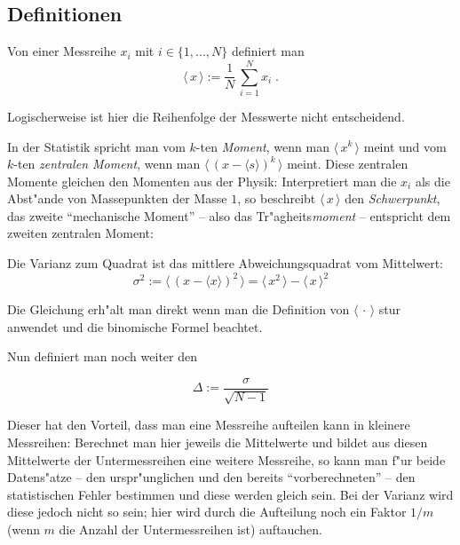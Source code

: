 \documentclass[a4paper]{book}
\newcommand{\mittel}[1]{\ensuremath{\langle  \, #1 \,  \rangle}}
\begin{document}
\subsection{Definitionen}
\label{sec:definitionen}


\begin{Def}
  [Mittelwert $\mittel \cdot$]
Von einer Messreihe $x_i$ mit $i  \in \{ 1, ..., N \}$ definiert man
\begin{equation}
  \label{eq:84}
  \mittel x := \frac{1}{N} \, \sum_{i = 1}^N x_i \;.
\end{equation}
\end{Def}
Logischerweise ist hier die Reihenfolge der Messwerte nicht
entscheidend.

In der Statistik spricht man vom $k$-ten \emph{Moment}, wenn man
$\mittel{ x^k }$ meint und vom $k$-ten \emph{zentralen Moment},
wenn man $\mittel{ (x-\langle s  \rangle)^k}$ meint. Diese
zentralen Momente gleichen den Momenten aus der Physik: Interpretiert
man die $x_i$ als die Abst"ande von Massepunkten der Masse $1$, so
beschreibt $\mittel x$ den \emph{Schwerpunkt}, das zweite
"`mechanische Moment"' -- also das Tr"agheits\emph{moment} --
entspricht dem zweiten zentralen Moment:

\begin{Def}
   Die Varianz zum Quadrat ist das mittlere
  Abweichungsquadrat vom Mittelwert:
  \begin{equation}
    \label{eq:85}
    \sigma^2 := \mittel{ (x-\langle x  \rangle )^2 }
= \mittel{ x^2  } - \mittel{ x  }^2
  \end{equation}
\end{Def}
Die Gleichung erh"alt man direkt wenn man die Definition von $\mittel
\cdot$ stur anwendet und die binomische Formel beachtet.

Nun definiert man noch weiter den 
\begin{Def}
  \begin{equation}
    \label{eq:86}
    \Delta := \frac{\sigma}{\sqrt{ N - 1}}
  \end{equation}
\end{Def}
Dieser hat den Vorteil, dass man eine Messreihe aufteilen kann in
kleinere Messreihen: Berechnet man hier jeweils die Mittelwerte 
und bildet aus diesen Mittelwerte der Untermessreihen eine weitere
Messreihe, so kann man f"ur beide Datens"atze -- den urspr"unglichen
und den bereits "`vorberechneten"' -- den statistischen Fehler
bestimmen und diese werden gleich sein. Bei der Varianz wird diese
jedoch nicht so sein; hier wird durch die Aufteilung noch ein Faktor
$1/m$ (wenn $m$ die Anzahl der Untermessreihen ist) auftauchen.
\end{document}
